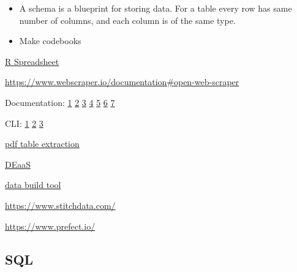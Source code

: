 \documentclass[]{book}
\begin{document}
\begin{itemize}
\item
  A schema is a blueprint for storing data. For a table every row has
  same number of columns, and each column is of the same type.
\item
  Make codebooks
\end{itemize}

\href{https://www.jamovi.org/}{R Spreadsheet}

\url{https://www.webscraper.io/documentation\#open-web-scraper}

Documentation: \href{http://databasenotetaker.com/}{1} \textbar{}
\href{https://dataedo.com/}{2} \textbar{}
\href{https://www.apexsql.com/sql-tools-doc.aspx}{3} \textbar{}
\href{https://techwriter.me/best-practices-guide/documenting-databases.aspx}{4}
\textbar{}
\href{http://help.osf.io/m/bestpractices/l/618767-how-to-make-a-data-dictionary}{5}
\textbar{}
\href{https://dataedo.com/blog/different-types-of-tools-you-can-use-to-document-your-database}{6}
\textbar{} \href{https://drawsql.app/\#features}{7}

CLI:
\href{http://bconnelly.net/working-with-csvs-on-the-command-line/\#taking-a-peek-at-the-data-set}{1}
\textbar{}
\href{https://opensource.com/article/17/2/command-line-tools-data-analysis-linux?sc_cid=701600000011jJVAAY}{2}
\textbar{}
\href{http://alexisperrier.com/shell/2017/11/07/command-line-data-scientist.html}{3}

\href{https://tabula.technology}{pdf table extraction}

\href{https://www.astronomer.io/}{DEaaS}

\href{https://www.getdbt.com/}{data build tool}

\url{https://www.stitchdata.com/}

\url{https://www.prefect.io/}

\subsection{SQL}\label{sql}
\end{document}
